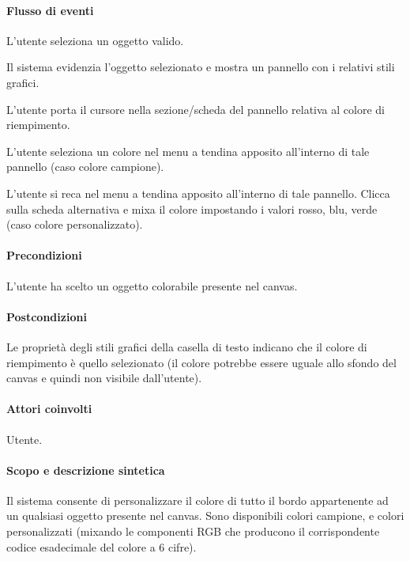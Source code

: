 \paragraph{Flusso di eventi}
\begin{elenconumerato}[\textbf{}]{\subsubsecindent}
\item L'utente seleziona un oggetto valido.
\item Il sistema evidenzia l'oggetto selezionato e mostra un pannello con i relativi stili grafici.
\item L'utente porta il cursore nella sezione/scheda del pannello relativa al colore di riempimento.
\item L'utente seleziona un colore nel menu a tendina apposito all'interno di tale pannello (caso colore campione).
\item L'utente si reca nel menu a tendina apposito all'interno di tale pannello. Clicca sulla scheda alternativa e mixa il colore impostando i valori rosso, blu, verde (caso colore personalizzato).
\end{elenconumerato}
\paragraph{Precondizioni}L'utente ha scelto un oggetto colorabile presente nel canvas.
\paragraph{Postcondizioni}Le propriet\` a degli stili grafici della casella di testo indicano che il colore di riempimento \` e  quello selezionato (il colore potrebbe essere uguale allo sfondo del canvas e quindi non visibile dall'utente).


\paragraph{Attori coinvolti} Utente.
\paragraph{Scopo e descrizione sintetica} Il sistema consente di personalizzare il colore di tutto il bordo appartenente ad un qualsiasi oggetto presente nel canvas. Sono disponibili colori campione, e colori personalizzati (mixando le componenti RGB che producono il corrispondente codice esadecimale del colore a 6 cifre).
